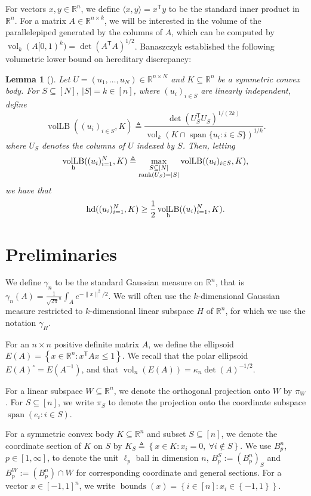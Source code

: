 \documentclass[12pt]{article}
\newtheorem{lemma}{Lemma}
\newcommand{\R}{{\mathbb{R}}}
\newcommand{\T}{\mathsf T}
\newcommand{\eqdef}{\triangleq}
\newcommand{\inner}[2]{\langle #1, #2 \rangle}
\newcommand{\set}[1]{\left\{ #1 \right\}}
\DeclareMathOperator{\vollb}{volLB}
\DeclareMathOperator{\hd}{hd}
\DeclareMathOperator{\vol}{vol}
\DeclareMathOperator{\lspan}{span}
\DeclareMathOperator{\bnds}{bounds}
\begin{document}
For vectors $x,y \in \R^n$, we define $\inner{x}{y} = x^\T y$ to be the standard
inner product in $\R^n$. For a matrix $A \in \R^{n \times k}$, we will be
interested in the volume of the parallelepiped generated by the columns of $A$,
which can be computed by $\vol_k(A[0,1)^k) = \det(A^\T A)^{1/2}$.  Banaszczyk
established the following volumetric lower bound on hereditary discrepancy:

\begin{lemma}[\cite{Bana93}]
\label{lem:vol-lb}
Let $U = (u_1,\dots,u_N) \in \R^{n \times N}$ and $K \subseteq \R^n$ be a
symmetric convex body. For $S \subseteq [N]$, $|S| = k \in [n]$, where $(u_i)_{i
\in S}$ are linearly independent, define  
\begin{equation}
\label{eq:vol-lb}
\vollb((u_i)_{i \in S}, K) 
                         \eqdef \frac{\det(U_S^\T U_S)^{1/(2k)}}{\vol_{k}(K \cap
\lspan\{u_i: i \in S\})^{1/k}}.
\end{equation}
where $U_S$ denotes the columns of $U$ indexed by $S$. Then, letting
\[
\vollb_{\rm h}((u_i)_{i=1}^N, K) \eqdef \max_{\substack{S \subseteq [N] \\ {\rm
rank}(U_S) = |S|}} \vollb((u_i)_{i \in S},K),
\]
we have that
\[
\hd((u_i)_{i=1}^N,K) \geq \frac{1}{2} \vollb_{\rm h}((u_i)_{i=1}^N,K) .
\]
\end{lemma}

\section{Preliminaries}

We define $\gamma_n$ to be the standard Gaussian measure on $\R^n$, that is
$\gamma_n(A) = \frac{1}{\sqrt{2\pi}^n} \int_A e^{-\|x\|^2/2}$. We will often use
the $k$-dimensional Gaussian measure restricted to $k$-dimensional linear
subspace $H$ of $\R^n$, for which we use the notation $\gamma_H$.

For an $n \times n$ positive definite matrix $A$, we define the ellipsoid $E(A)
= \set{x \in \R^n: x^\T A x \leq 1}$. We recall that the polar ellipsoid
$E(A)^\circ = E(A^{-1})$, and that $\vol_n(E(A)) = \kappa_n \det(A)^{-1/2}$.

For a linear subspace $W \subseteq \R^n$, we denote the orthogonal projection
onto $W$ by $\pi_W$. For $S \subseteq [n]$, we write $\pi_S$ to denote the
projection onto the coordinate subspace $\lspan(e_i: i \in S)$.

For a symmetric convex body $K \subseteq \R^n$ and subset $S \subseteq [n]$, we
denote the coordinate section of $K$ on $S$ by $K_S \eqdef \set{x \in K: x_i =
0, ~\forall i \notin S}$. We use $B_p^n$, $p \in [1,\infty]$, to denote the unit
$\ell_p$ ball in dimension $n$, $B_p^S := (B_p^n)_S$ and $B_p^W := (B_p^n) \cap W$
for corresponding coordinate and general sections. For a vector $x \in
[-1,1]^n$, we write $\bnds(x) = \set{i \in [n]: x_i \in \set{-1,1}}$.
\end{document}
